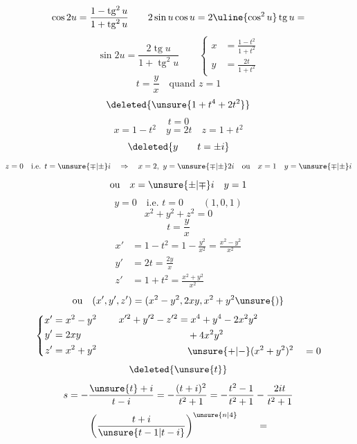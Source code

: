 \[
\cos 2u=\frac{1-\operatorname{tg}^2u}{1+\operatorname{tg}^2u}
\qquad
2\sin u\cos u=2\uline{\cos^2u}\operatorname{tg}u=
\]
\[
\sin 2u=\frac{2\operatorname{tg}u}{1+\operatorname{tg}^2u}
\qquad
\left\{\begin{aligned}
x&=\frac{1-t^2}{1+t^2}\\
y&=\frac{2t}{1+t^2}
\end{aligned}\right.
\]
\[t=\frac yx\quad\text{quand }z=1\]
\[\deleted{\unsure{1+t^4+2t^2}}\]
\[t=0\]
\[x=1-t^2\quad y=2t\quad z=1+t^2\]
\[\deleted{y\qquad t=\pm i}\]
\[
z=0\quad\text{i.e. }t=\unsure{\mp|\pm}i\quad\Rightarrow\quad x=2,\ y=\unsure{\mp|\pm}2i
\quad\text{ou}\quad x=1\quad y=\unsure{\mp|\pm}i
\]
\[\text{ou}\quad x=\unsure{\pm|\mp}i\quad y=1\]
\[y=0\quad\text{i.e. }t=0\qquad(1,0,1)\]
\[
x^2+y^2+z^2=0
\]
\[t=\frac yx\]
\[
\begin{aligned}
x'&=1-t^2=1-\frac{y^2}{x^2}=\frac{x^2-y^2}{x^2}\\
y'&=2t=\frac{2y}{x}\\
z'&=1+t^2=\frac{x^2+y^2}{x^2}
\end{aligned}
\]
\[\text{ou}\quad (x',y',z')=(x^2-y^2,2xy,x^2+y^2\unsure{)}\]
\[
\left\{\begin{aligned}
x'&=x^2-y^2\\
y'&=2xy\\
z'&=x^2+y^2
\end{aligned}\right.
\qquad
\begin{aligned}
x'^2+y'^2-z'^2&=x^4+y^4-2x^2y^2\\
&\quad+4x^2y^2\\
&\quad\unsure{+|-}(x^2+y^2)^2\quad=0
\end{aligned}
\]
\[\deleted{\unsure{t}}\]
\[
s=-\frac{\unsure{t}+i}{t-i}=-\frac{(t+i)^2}{t^2+1}=-\frac{t^2-1}{t^2+1}-\frac{2it}{t^2+1}
\]
\[
\left(\frac{t+i}{\unsure{t-1|t-i}}\right)^{\unsure{n|4}}\qquad=
\]
